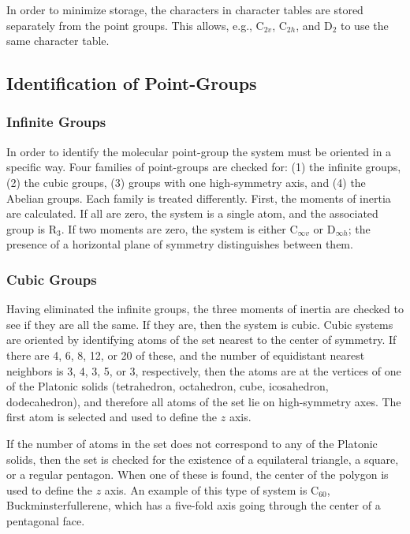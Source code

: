 In order to minimize storage, the characters in  character tables are stored
separately from the point groups.  This allows, e.g., C$_{2v}$, C$_{2h}$, and
D$_{2}$ to use the same character table. 

\subsection{Identification of Point-Groups}
\subsubsection*{Infinite Groups}
In order to identify the molecular point-group the system must be oriented in a
specific way.  Four families of point-groups are checked for: (1) the infinite
groups, (2) the cubic groups, (3)  groups with one high-symmetry axis, and (4)
the Abelian groups. Each family is treated differently.  First, the moments of
inertia are calculated.  If all are zero, the system is a single atom, and the
associated group is R$_3$.  If two moments are zero, the system is  either
C$_{\infty v}$ or D$_{\infty h}$; the presence of a horizontal plane of
symmetry distinguishes between them.

\subsubsection*{Cubic Groups}
Having eliminated the infinite groups, the three moments of inertia are checked
to see if they are all the same.  If they are, then the system is cubic.  Cubic
systems are oriented by identifying atoms of the set nearest to the center of
symmetry.  If there are 4, 6, 8, 12, or 20 of these, and the number of
equidistant nearest neighbors  is 3, 4, 3, 5, or 3, respectively, then the
atoms are 
at the vertices of one of the Platonic solids (tetrahedron, octahedron, cube,
icosahedron, dodecahedron),
and therefore all atoms of the set lie on high-symmetry axes.  The first  atom
is selected and used to define the $z$ axis.

  If the number of atoms in
the set does not correspond to any of the Platonic solids, then the set is
checked for the existence of a equilateral triangle, a square, or a regular
pentagon.  When one of these is found, the center of the polygon is used to
define the $z$ axis.  An example of this type of system is C$_{60}$,
Buckminsterfullerene, which has a five-fold axis going through the center of a
pentagonal face.


